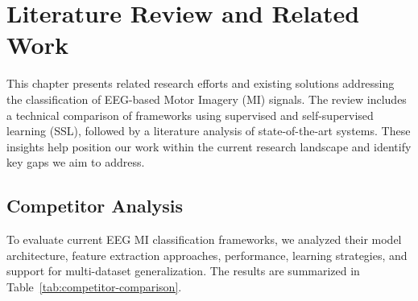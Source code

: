 \chapter{Literature Review and Related Work}
\label{ch:relatedworks}

This chapter presents related research efforts and existing solutions addressing the classification of EEG-based Motor Imagery (MI) signals. The review includes a technical comparison of frameworks using supervised and self-supervised learning (SSL), followed by a literature analysis of state-of-the-art systems. These insights help position our work within the current research landscape and identify key gaps we aim to address.

\section{Competitor Analysis}
\label{sec:competitor-analysis}

To evaluate current EEG MI classification frameworks, we analyzed their model architecture, feature extraction approaches, performance, learning strategies, and support for multi-dataset generalization. The results are summarized in Table~\ref{tab:competitor-comparison}.

